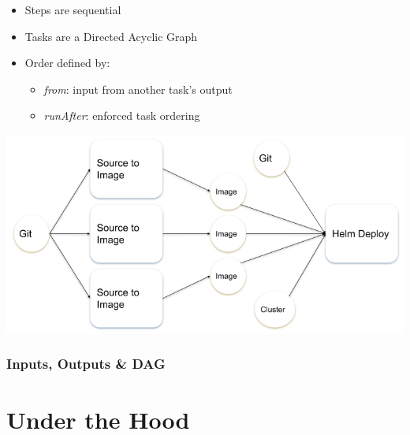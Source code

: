 \documentclass[aspectratio=169,11pt,hyperref={colorlinks=true}]{beamer}
\begin{document}
\begin{lblackrwhiteframe}
\begin{blackframe}
\begin{2columnsframe}
  {
    \begin{itemize}
      \item Steps are sequential
      \item Tasks are a Directed Acyclic Graph
    \end{itemize}
    \vspace{10pt}
    \begin{itemize}
      \item Order defined by:
      \begin{itemize}
        \item {\em from}: input from another task's output
        \item {\em runAfter}: enforced task ordering
      \end{itemize}
    \end{itemize}
  }
  {
    \includegraphics[width=0.4\paperwidth]{img/pipeline.png}
  }
  \frametitle{Inputs, Outputs \& DAG}
\end{2columnsframe}

\section{Under the Hood}


\end{blackframe}
\end{lblackrwhiteframe}
\end{document}
